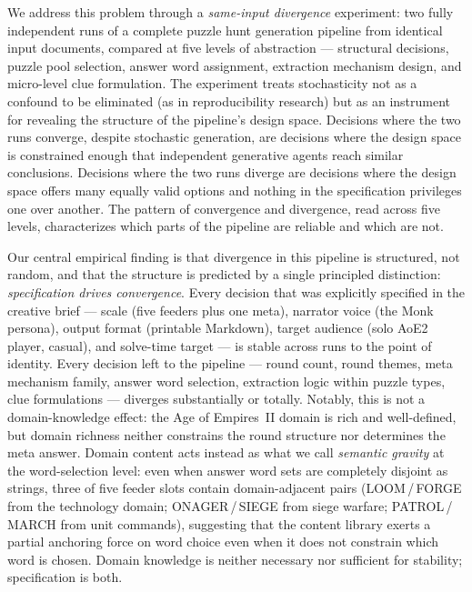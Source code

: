 We address this problem through a \emph{same-input divergence} experiment: two fully independent runs of a complete puzzle hunt generation pipeline from identical input documents, compared at five levels of abstraction --- structural decisions, puzzle pool selection, answer word assignment, extraction mechanism design, and micro-level clue formulation. The experiment treats stochasticity not as a confound to be eliminated (as in reproducibility research) but as an instrument for revealing the structure of the pipeline's design space. Decisions where the two runs converge, despite stochastic generation, are decisions where the design space is constrained enough that independent generative agents reach similar conclusions. Decisions where the two runs diverge are decisions where the design space offers many equally valid options and nothing in the specification privileges one over another. The pattern of convergence and divergence, read across five levels, characterizes which parts of the pipeline are reliable and which are not.

Our central empirical finding is that divergence in this pipeline is structured, not random, and that the structure is predicted by a single principled distinction: \emph{specification drives convergence}. Every decision that was explicitly specified in the creative brief --- scale (five feeders plus one meta), narrator voice (the Monk persona), output format (printable Markdown), target audience (solo AoE2 player, casual), and solve-time target --- is stable across runs to the point of identity. Every decision left to the pipeline --- round count, round themes, meta mechanism family, answer word selection, extraction logic within puzzle types, clue formulations --- diverges substantially or totally. Notably, this is not a domain-knowledge effect: the Age of Empires~II domain is rich and well-defined, but domain richness neither constrains the round structure nor determines the meta answer. Domain content acts instead as what we call \emph{semantic gravity} at the word-selection level: even when answer word sets are completely disjoint as strings, three of five feeder slots contain domain-adjacent pairs (LOOM\,/\,FORGE from the technology domain; ONAGER\,/\,SIEGE from siege warfare; PATROL\,/\,MARCH from unit commands), suggesting that the content library exerts a partial anchoring force on word choice even when it does not constrain which word is chosen. Domain knowledge is neither necessary nor sufficient for stability; specification is both.


